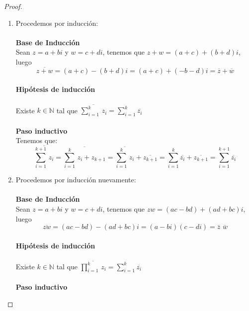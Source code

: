 \documentclass[11pt,letterpaper]{article}
\newcommand{\N}{\mathbb{N}}
\begin{document}
\begin{proof}\,\\
    \begin{enumerate}
        \item Procedemos por inducci\'on:\,\\
        \,\\
        \textbf{Base de Inducci\'on}\,\\
        Sean $z=a+bi$ y $w=c+di$, tenemos que $z+w=(a+c)+(b+d)i$, luego\,\\
        \begin{equation*}
            \overline{z+w}=(a+c)-(b+d)i=(a+c)+(-b-d)i=\overline{z}+\overline{w}
        \end{equation*}\,\\
        \textbf{Hip\'otesis de inducci\'on}\,\\
        \,\\
        Existe $k\in \N$ tal que $\overline{\sum_{i=1}^k\,z_i}=\sum_{i=1}^k\overline{z_i}$\,\\
        \,\\
        \textbf{Paso inductivo}\,\\
        Tenemos que:\,\\
        \begin{equation*}
            \overline{\sum_{i=1}^{k+1}\,z_i}=\overline{\sum_{i=1}^{k}\,z_i+z_{k+1}}=\overline{\sum_{i=1}^{k}\,z_i}+\overline{z_{k+1}}=\sum_{i=1}^k\overline{z_i}+\overline{z_{k+1}}=\sum_{i=1}^{k+1}\overline{z_i}
        \end{equation*}
        \item Procedemos por inducci\'on nuevamente:\,\\
        \,\\
        \textbf{Base de Inducci\'on}\,\\
        Sean $z=a+bi$ y $w=c+di$, tenemos que $zw=(ac-bd)+(ad+bc)i$, luego\,\\
        \begin{equation*}
            \overline{zw}=(ac-bd)-(ad+bc)i=(a-bi)(c-di)=\overline{z}\,\,\overline{w}
        \end{equation*}\,\\
        \textbf{Hip\'otesis de inducci\'on}\,\\
        \,\\
        Existe $k\in \N$ tal que $\overline{\prod_{i=1}^k\,z_i}=\sum_{i=1}^k\overline{z_i}$\,\\
        \,\\
        \textbf{Paso inductivo}\,\\

\end{enumerate}
\end{proof}
\end{document}

